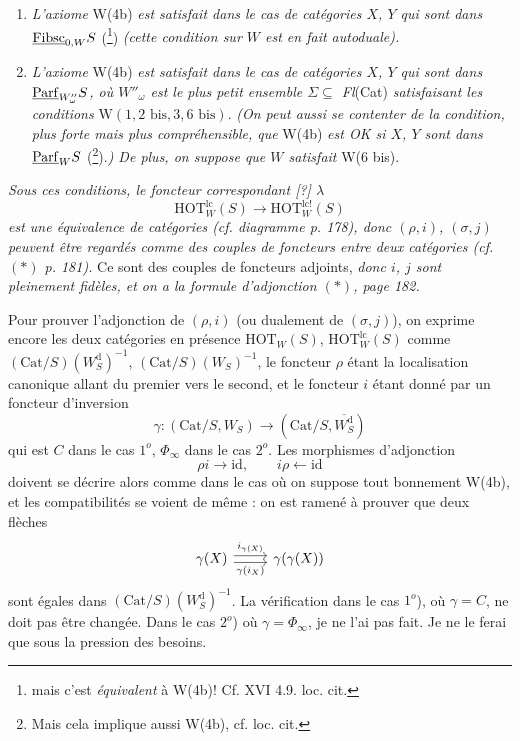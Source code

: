 \begin{enumerate}[label={}]
\item[$1^o$)] \textit{L'axiome} W(4b) \textit{est satisfait dans le cas de catégories $X$, $Y$ qui sont dans} $\underline{\mathrm{Fibsc}}_{0,W} S$ (\footnote[95]{mais c'est \textit{équivalent} à W(4b)! Cf. XVI 4.9. loc. cit.}) \textit{(cette condition sur $W$ est en fait autoduale).}

\item[$2^o$)] \textit{L'axiome} W(4b) \textit{est satisfait dans le cas de catégories $X$, $Y$ qui sont dans} $\underline{\mathrm{Parf}}_{W''_\omega} S$\textit{, où $W''_\omega$ est le plus petit ensemble $\Sigma \subseteq$ Fl}(Cat) \textit{satisfaisant les conditions} $\mathrm{W}(1, 2\text{ bis}, 3, 6\text{ bis})$. \textit{(On peut aussi se contenter de la condition, plus forte mais plus compréhensible, que} W(4b) \textit{est OK si $X$, $Y$ sont dans} $\underline{\mathrm{Parf}}_W S$ (\footnote[96]{Mais cela implique aussi W(4b), cf. loc. cit.}).\textit{) De plus, on suppose que $W$ satisfait} W(6 bis).
\end{enumerate}

\textit{Sous ces conditions, le foncteur correspondant [?] $\lambda$}
\[
\mathrm{HOT}^{\mathrm{lc}}_W(S) \longrightarrow \mathrm{HOT}^{\mathrm{lc!}}_W(S)
\]
\textit{est une équivalence de catégories (cf. diagramme p. 178), donc $(\rho, i)$, $(\sigma, j)$ peuvent être regardés comme des couples de foncteurs entre deux catégories (cf. $(*)$ p. 181).} Ce sont des couples de foncteurs adjoints, \textit{donc $i$, $j$ sont pleinement fidèles, et on a la formule d'adjonction $(*)$, page 182.}

Pour prouver l'adjonction de $(\rho, i)$ (ou dualement de $(\sigma, j)$), on exprime encore les deux catégories en présence $\mathrm{HOT}_W(S)$, $\mathrm{HOT}^{\mathrm{lc}}_W(S)$ comme $(\mathrm{Cat}/S)(W_S^{\mathrm{d}})^{-1}$, $(\mathrm{Cat}/S)(W_S)^{-1}$, le foncteur $\rho$ étant la localisation canonique allant du premier vers le second, et le foncteur $i$ étant donné par un foncteur d'inversion
\[
\gamma : (\mathrm{Cat}/S, W_S) \longrightarrow (\mathrm{Cat}/S, \overline{W_S^{\mathrm{d}}})
\]
qui est $C$ dans le cas $1^o$, $\Phi_\infty$ dans le cas $2^o$. Les morphismes d'adjonction
\[
\rho i \longrightarrow \mathrm{id}, \qquad i\rho \longleftarrow \mathrm{id}
\]
doivent se décrire alors comme dans le cas où on suppose tout bonnement W(4b), et les compatibilités se voient de même : on est ramené à prouver que deux flèches
\[
\begin{tikzcd}
\gamma(X) \arrow[r, shift left, "i_{\gamma(X)}"] \arrow[r, shift right, "\gamma(i_X)"'] & \gamma(\gamma(X))
\end{tikzcd}
\]
sont égales dans $(\mathrm{Cat}/S)(W_S^{\mathrm{d}})^{-1}$. La vérification dans le cas $1^o$), où $\gamma = C$, ne doit pas être changée. Dans le cas $2^o$) où $\gamma = \Phi_\infty$, je ne l'ai pas fait. Je ne le ferai que sous la pression des besoins.


